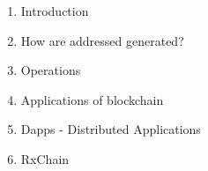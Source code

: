 \begin{enumerate}
  
  \item Introduction
    
    
  \item How are addressed generated?
    

\newpage
  \item Operations
    
    
  \item Applications of blockchain
    

  \item Dapps - Distributed Applications
    
    
  \item RxChain
    

\end{enumerate}

